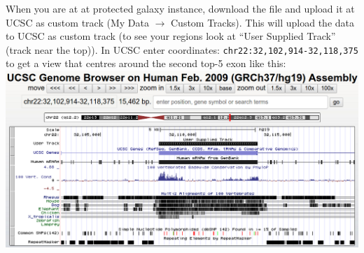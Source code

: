 \documentclass[11pt,a4paper]{article}
\begin{document}
When you are at at protected galaxy instance, download the file and upload it at UCSC as custom track (My Data $\rightarrow$ Custom Tracks). This will upload the data to UCSC as custom track (to
see your regions look at ``User Supplied Track'' (track near the top)). In UCSC enter coordinates: \verb|chr22:32,102,914-32,118,375| to get a view that centres around the second top-5 exon like this:\\
\includegraphics[width=\textwidth]{figures/101_21}\\
\end{document}
